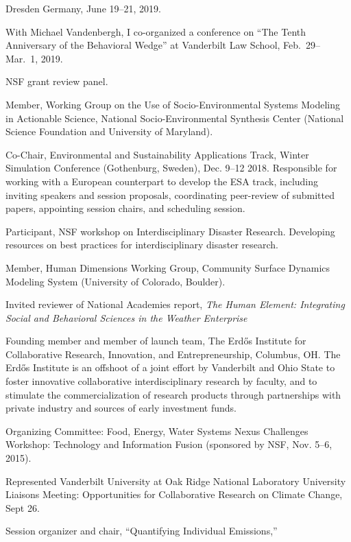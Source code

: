   Dresden Germany, June 19--21, 2019.
\item[2019] With Michael Vandenbergh, I co-organized a conference on
  ``The Tenth Anniversary of the Behavioral Wedge'' at Vanderbilt Law School,
   Feb.~29--Mar.~1, 2019.
\item[2018] NSF grant review panel.
\item[2018] Member, Working Group on the Use of Socio-Environmental Systems
  Modeling in Actionable Science,
  National Socio-Environmental Synthesis Center
  (National Science Foundation and University of Maryland).
\item[2018] Co-Chair, Environmental and Sustainability Applications Track,
   Winter Simulation Conference (Gothenburg, Sweden), Dec. 9--12 2018.
   Responsible for working with a European counterpart to develop the ESA
   track, including inviting speakers and session proposals, coordinating
   peer-review of submitted papers, appointing session chairs, and scheduling
   session.
\item[2017--2018] Participant, NSF workshop on
  Interdisciplinary Disaster Research.
  Developing resources on best practices for interdisciplinary disaster
  research.
\item[2017--2018] Member, Human Dimensions Working Group,
  Community Surface Dynamics Modeling System (University of Colorado, Boulder).
\item[2017] Invited reviewer of National Academies report,
  \emph{The Human Element: Integrating Social and Behavioral Sciences in the
    Weather Enterprise}
\item[2017] Founding member and member of launch team,
  The Erd\H{o}s Institute for Collaborative Research, Innovation, and
  Entrepreneurship, Columbus, OH.
  The Erd\H{o}s Institute is an offshoot of a joint effort by Vanderbilt and
  Ohio State to foster innovative collaborative interdisciplinary research by
  faculty, and to stimulate the commercialization of research products through
  partnerships with private industry and sources of early investment funds.
\item[2015] Organizing Committee:
  Food, Energy, Water Systems Nexus Challenges Workshop: Technology and
  Information Fusion (sponsored by NSF, Nov. 5--6, 2015).
\item[2007] Represented Vanderbilt University at Oak Ridge National Laboratory
  University Liaisons Meeting: Opportunities for Collaborative Research on
  Climate Change, Sept 26.
\item[2008] Session organizer and chair, ``Quantifying Individual Emissions,''
